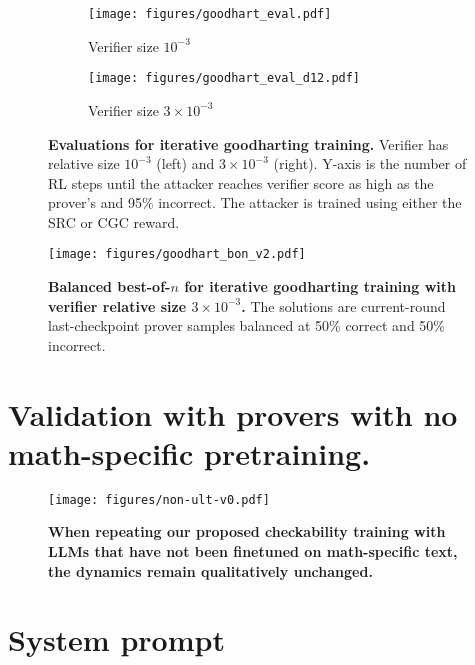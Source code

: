 \documentclass{article}
\begin{document}
\begin{figure}[h!]
\centering
\begin{subfigure}{.49\textwidth}
  \centering
  \texttt{[image: figures/goodhart\_eval.pdf]}
  \caption{Verifier size $10^{-3}$}
  \label{fig:sup:goodhart-offline-eval-1}
\end{subfigure}
\begin{subfigure}{.49\textwidth}
  \centering
  \texttt{[image: figures/goodhart\_eval\_d12.pdf]}
  \caption{Verifier size $3 \times 10^{-3}$}
  \label{fig:sup:goodhart-offline-eval-2}
\end{subfigure}
\caption{\textbf{Evaluations for iterative goodharting training.} Verifier has relative size $10^{-3}$ (left) and $3 \times 10^{-3}$ (right). Y-axis is the number of RL steps until the attacker reaches verifier score as high as the prover's and 95\% incorrect. The attacker is trained using either the SRC or CGC reward.}
\label{fig:sup:goodhart-offline-eval}
\end{figure}

\begin{figure}[h]
    \centering
    \texttt{[image: figures/goodhart\_bon\_v2.pdf]}
    \caption{\textbf{Balanced best-of-$n$ for iterative goodharting training with verifier relative size $3 \times 10^{-3}$.} The solutions are current-round last-checkpoint prover samples balanced at 50\% correct and 50\% incorrect.}
    \label{fig:sup:goodhart-bon}
\end{figure}
\clearpage
\section{Validation with provers with no math-specific pretraining.}

\begin{figure}[h]
    \centering
    \texttt{[image: figures/non-ult-v0.pdf]}
    \caption{\textbf{When repeating our proposed checkability training with LLMs that have not been finetuned on math-specific text, the dynamics remain qualitatively unchanged.}}
    \label{fig:sup:non-ult}
\end{figure}
\clearpage
\section{System prompt}\label{sec:app:prompts}
\end{document}
